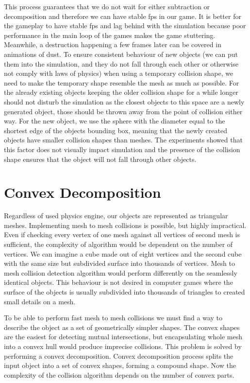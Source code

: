 This process guarantees that we do not wait for either subtraction or decomposition and therefore we can have stable fps in our game.  It is better for the gameplay to have stable fps and lag behind with the simulation because poor performance in the main loop of the games makes the game stuttering. Meanwhile, a destruction happening a few frames later can be covered in animations of dust. To ensure consistent behaviour of new objects (we can put them into the simulation, and they do not fall through each other or otherwise not comply with laws of physics) when using a temporary collision shape, we need to make the temporary shape resemble the mesh as much as possible.  For the already existing objects keeping the older collision shape for a while longer should not disturb the simulation as the closest objects to this space are a newly generated object, those should be thrown away from the point of collision either way. For the new object, we use the sphere with the diameter equal to the shortest edge of the objects bounding box, meaning that the newly created objects have smaller collision shapes than meshes. The experiments showed that this factor does not visually impact simulation and the presence of the collision shape ensures that the object will not fall through other objects. 


\section{Convex Decomposition}
\label{sec:decomposition}
Regardless of used physics engine, our objects are represented as triangular meshes. Implementing mesh to mesh collisions is possible, but highly impractical. Even if checking every vertex of one mesh against all vertices of second mesh is sufficient, the complexity of algorithm would be dependent on the number of vertices. We can imagine a cube made out of eight vertices and the second cube with the same size but subdivided surface into thousands of vertices. Mesh to mesh collision detection algorithm would perform differently on the seamlessly identical objects. This behaviour is not desired in computer games where the surface of the objects is usually subdivided into thousands of triangles to created small details on a mesh.

To be able to perform fast mesh to mesh collisions we must find a way to describe the object as a set of geometrically simpler shapes. The convex shapes are the easiest for detecting mutual intersections, but encapsulating whole mesh into a convex hull would produce imprecise collisions. This problem is solved by performing a convex decomposition. Convex decomposition process splits the input object into a set of convex shapes, forming a compound shape. Now the complexity of the collision algorithm depends on the number of convex parts. 

